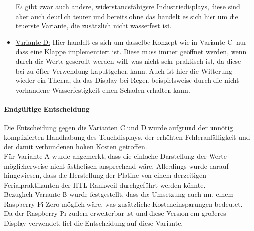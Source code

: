 \begin{itemize}
    Es gibt zwar auch andere, widerstandsfähigere Industriedisplays, diese sind aber auch deutlich teurer und bereits ohne das handelt es sich hier um die teuerste Variante, die zusätzlich nicht wasserfest ist.
	\item \underline{Variante D:} Hier handelt es sich um dasselbe Konzept wie in Variante C, nur dass eine Klappe implementiert ist. Diese muss immer geöffnet werden, wenn durch die Werte gescrollt werden will, was nicht sehr praktisch ist, da diese bei zu öfter Verwendung kaputtgehen kann. Auch ist hier die Witterung wieder ein Thema, da das Display bei Regen beispielsweise durch die nicht vorhandene Wasserfestigkeit einen Schaden erhalten kann.
\end{itemize}

\paragraph{Endgültige Entscheidung}
Die Entscheidung gegen die Varianten C und D wurde aufgrund der unnötig komplizierten Handhabung des Touchdisplays, der erhöhten Fehleranfälligkeit und der damit verbundenen hohen Kosten getroffen. \\
Für Variante A wurde angemerkt, dass die einfache Darstellung der Werte möglicherweise nicht ästhetisch ansprechend wäre. Allerdings wurde darauf hingewiesen, dass die Herstellung der Platine von einem derzeitigen Ferialpraktikanten der HTL Rankweil durchgeführt werden könnte. \\
Bezüglich Variante B wurde festgestellt, dass die Umsetzung auch mit einem Raspberry Pi Zero möglich wäre, was zusätzliche Kosteneinsparungen bedeutet. Da der Raspberry Pi zudem erweiterbar ist und diese Version ein größeres Display verwendet, fiel die Entscheidung auf diese Variante.

